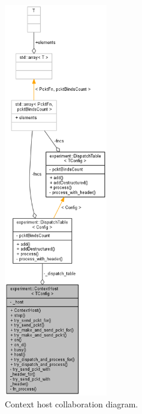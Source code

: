 \documentclass[11pt]{report}
\newcommand{\+}{\discretionary{\mbox{\scriptsize$\hookleftarrow$}}{}{}}
\begin{document}
                \begin{figure}[H]
                \caption{Context host collaboration diagram.}
                \centering
                \includegraphics[width=0.4\textwidth]{d/coll/coll_ctxhost.png}
                \end{figure}

                \newpage
\end{document}

